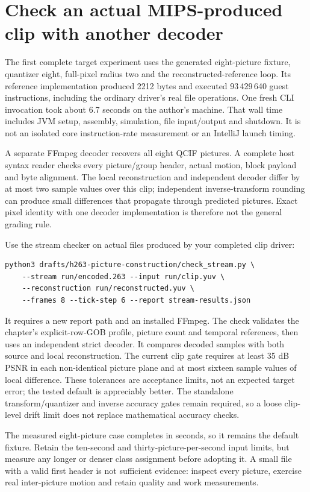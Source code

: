 \section{Check an actual MIPS-produced clip with another decoder}
The first complete target experiment uses the generated eight-picture fixture,
quantizer eight, full-pixel radius two and the reconstructed-reference loop.
Its reference implementation produced 2212 bytes and executed 93\,429\,640 guest
instructions, including the ordinary driver's real file operations. One fresh
CLI invocation took about 6.7 seconds on the author's machine. That wall time
includes JVM setup, assembly, simulation, file input/output and shutdown. It is
not an isolated core instruction-rate measurement or an IntelliJ launch timing.

A separate FFmpeg decoder recovers all eight QCIF pictures. A complete host
syntax reader checks every picture/group header, actual motion, block payload
and byte alignment. The local reconstruction and independent decoder differ by
at most two sample values over this clip; independent inverse-transform rounding
can produce small differences that propagate through predicted pictures. Exact
pixel identity with one decoder implementation is therefore not the general
grading rule.

Use the stream checker on actual files produced by your completed clip driver:
\begin{verbatim}
python3 drafts/h263-picture-construction/check_stream.py \
    --stream run/encoded.263 --input run/clip.yuv \
    --reconstruction run/reconstructed.yuv \
    --frames 8 --tick-step 6 --report stream-results.json
\end{verbatim}
It requires a new report path and an installed FFmpeg. The check validates the
chapter's explicit-row-GOB profile, picture count and temporal references, then
uses an independent strict decoder. It compares decoded samples with both source
and local reconstruction. The current clip gate requires at least 35 dB PSNR in
each non-identical picture plane and at most sixteen sample values of local
difference. These tolerances are acceptance limits, not an expected target error;
the tested default is appreciably better. The standalone transform/quantizer and
inverse accuracy gates remain required, so a loose clip-level drift limit does
not replace mathematical accuracy checks.

The measured eight-picture case completes in seconds, so it remains the default
fixture. Retain the ten-second and thirty-picture-per-second input limits, but
measure any longer or denser class assignment before adopting it. A small file
with a valid first header is not sufficient evidence: inspect every picture,
exercise real inter-picture motion and retain quality and work measurements.
